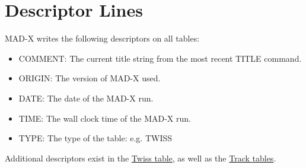 
\section{Descriptor Lines}

MAD-X writes the following descriptors on all tables: 
\begin{itemize}
   \item COMMENT: The current title string from the most recent TITLE command. 
   \item ORIGIN: The version of MAD-X used. 
   \item DATE: The date of the MAD-X run. 
   \item TIME: The wall clock time of the MAD-X run. 
   \item TYPE: The type of the table: e.g. TWISS 
\end{itemize} 

Additional descriptors exist in the \href{twiss_desc.html}{Twiss table},
as well as the \href{tables.html#track}{Track tables}.  

